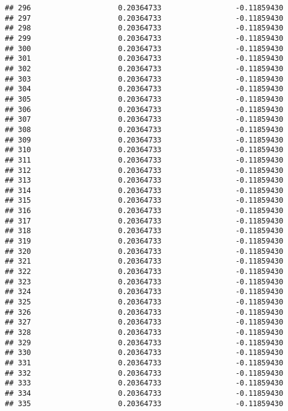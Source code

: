 \documentclass[]{article}
\begin{document}
\begin{verbatim}
## 296                    0.20364733                 -0.11859430
## 297                    0.20364733                 -0.11859430
## 298                    0.20364733                 -0.11859430
## 299                    0.20364733                 -0.11859430
## 300                    0.20364733                 -0.11859430
## 301                    0.20364733                 -0.11859430
## 302                    0.20364733                 -0.11859430
## 303                    0.20364733                 -0.11859430
## 304                    0.20364733                 -0.11859430
## 305                    0.20364733                 -0.11859430
## 306                    0.20364733                 -0.11859430
## 307                    0.20364733                 -0.11859430
## 308                    0.20364733                 -0.11859430
## 309                    0.20364733                 -0.11859430
## 310                    0.20364733                 -0.11859430
## 311                    0.20364733                 -0.11859430
## 312                    0.20364733                 -0.11859430
## 313                    0.20364733                 -0.11859430
## 314                    0.20364733                 -0.11859430
## 315                    0.20364733                 -0.11859430
## 316                    0.20364733                 -0.11859430
## 317                    0.20364733                 -0.11859430
## 318                    0.20364733                 -0.11859430
## 319                    0.20364733                 -0.11859430
## 320                    0.20364733                 -0.11859430
## 321                    0.20364733                 -0.11859430
## 322                    0.20364733                 -0.11859430
## 323                    0.20364733                 -0.11859430
## 324                    0.20364733                 -0.11859430
## 325                    0.20364733                 -0.11859430
## 326                    0.20364733                 -0.11859430
## 327                    0.20364733                 -0.11859430
## 328                    0.20364733                 -0.11859430
## 329                    0.20364733                 -0.11859430
## 330                    0.20364733                 -0.11859430
## 331                    0.20364733                 -0.11859430
## 332                    0.20364733                 -0.11859430
## 333                    0.20364733                 -0.11859430
## 334                    0.20364733                 -0.11859430
## 335                    0.20364733                 -0.11859430

\end{verbatim}
\end{document}
